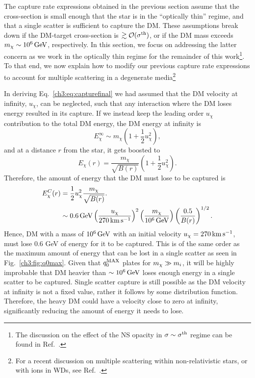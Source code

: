 The capture rate expressions obtained in the previous section assume that the cross-section is small enough that the star is in the ``optically thin'' regime, and that a single scatter is sufficient to capture the DM. These assumptions break down if the DM-target cross-section is $\gtrsim\mathcal{O}(\sigma^{\rm th})$, or if the DM mass exceeds $m_\chi \sim 10^6{\rm \,GeV}$, respectively. 
In this section, we focus on addressing the latter concern as we work in the optically thin regime for the remainder of this work\footnote{The discussion on the effect of the NS opacity in $\sigma\sim \sigma^{\rm th}$ regime can be found in Ref.~\cite{Bell:2020jou_sep_ImprovedTreatmentDark}.}. 
To that end, we now explain how to modify our previous capture rate expressions to account for multiple scattering in a degenerate media\footnote{For a recent discussion on multiple scattering within non-relativistic stars, or with ions in WDs, see Ref.~\cite{Dasgupta:2019juq_Darkmattercapture}.}


In deriving Eq.~\ref{ch3:eq:capturefinal} we had assumed that the DM velocity at infinity, $u_\chi$, can be neglected, such that any interaction where the DM loses energy resulted in its capture. If we instead keep the leading order $u_\chi$ contribution to the total DM energy, the DM energy at infinity is
\begin{equation}
    E^\infty_\chi \sim m_\chi \left(1+\frac{1}{2}u_\chi^2\right), 
\end{equation}
and at a distance $r$ from the star, it gets boosted to
\begin{equation}
    E_\chi(r) = \frac{m_\chi}{\sqrt{B(r)}} \left(1+\frac{1}{2}u_\chi^2\right).
    \label{ch3:eq:Echir}
\end{equation}
Therefore, the amount of energy that the DM must lose to be captured is
\begin{align}
    E_\chi^C(r) & =  \frac{1}{2}u_\chi^2 \frac{m_\chi}{\sqrt{B(r)}}. \\
                & \sim 0.6{\rm \,GeV} \left(\frac{u_\chi}{270{\rm \,km}{\rm \,s}^{-1}}\right)^2 \left(\frac{m_\chi}{10^6{\rm \,GeV}}\right)\left(\frac{0.5}{B(r)}\right)^{1/2}.
\end{align} 
Hence, DM with a mass of $10^6{\rm \,GeV}$ with an initial velocity $u_\chi = 270{\rm \,km}{\rm \,s}^{-1}$, must lose 0.6 GeV of energy for it to be captured. This is of the same order as the maximum amount of energy that can be lost in a single scatter as seen in Fig.~\ref{ch3:fig:q0max}. Given that $q_0^{\rm MAX}$ plates for $m_\chi \gg m_i$, it will be highly improbable that DM heavier than $\sim 10^6{\rm \,GeV}$ loses enough energy in a single scatter to be captured. Single scatter capture is still possible as the DM velocity at infinity is not a fixed value, rather it follows by some distribution function. Therefore, the heavy DM could have a velocity close to zero at infinity, significantly reducing the amount of energy it needs to lose.


